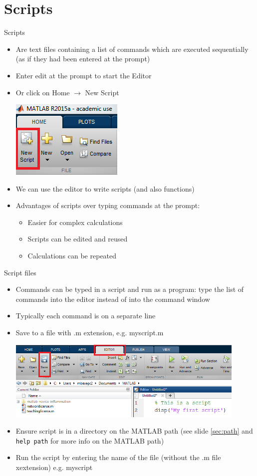 \documentclass{beamer}
\begin{document}
\section{Scripts}
\begin{frame}{Scripts}
	\begin{itemize}
		\item Are text files containing a list of commands which are executed sequentially (as if they had been entered at the prompt)
		\item Enter edit at the prompt to start the Editor
		\item Or click on Home $\rightarrow$ New Script
		
		\includegraphics[scale=0.7]{new_script}	
		
		\item We can use the editor to write scripts (and also functions)
		\item Advantages of scripts over typing commands at the prompt:
			\begin{itemize}
				\item Easier for complex calculations
				\item Scripts can be edited and reused
				\item Calculations can be repeated
			\end{itemize}
	\end{itemize}
\end{frame}

\begin{frame}{Script files}
	\begin{itemize}
		\item Commands can be typed in a script and run as a program: type the list of commands into the editor instead of into the command window
		\item Typically each command is on a separate line
		\item Save to a file with .m extension, e.g. myscript.m
		
		\includegraphics[width=0.9\textwidth]{save_script}
		\item Ensure script is in a directory on the MATLAB path (see slide \ref{sec:path} and \texttt{help path} for more info on the MATLAB path)
		\item Run the script by entering the name of the file (without the .m file xextension) e.g. myscript
	\end{itemize}
\end{frame}
\end{document}
